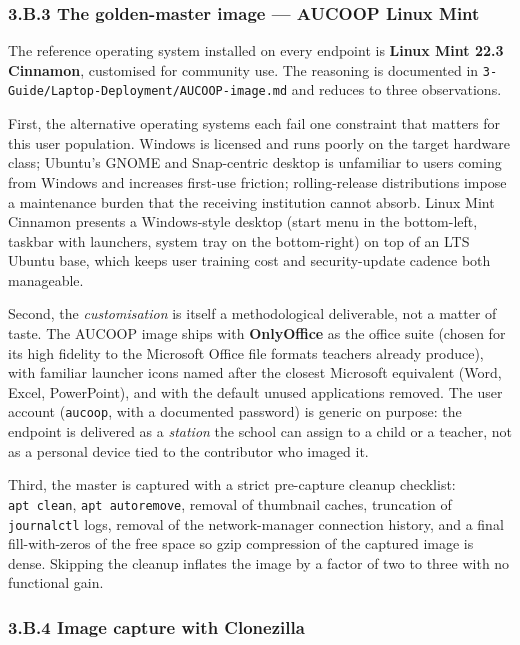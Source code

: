 \hypertarget{b.3-the-golden-master-image-aucoop-linux-mint}{%
\subsubsection{3.B.3 The golden-master image --- AUCOOP Linux
Mint}\label{b.3-the-golden-master-image-aucoop-linux-mint}}

The reference operating system installed on every endpoint is
\textbf{Linux Mint 22.3 Cinnamon}, customised for community use. The
reasoning is documented in
\texttt{3-Guide/Laptop-Deployment/AUCOOP-image.md} and reduces to three
observations.

First, the alternative operating systems each fail one constraint that
matters for this user population. Windows is licensed and runs poorly on
the target hardware class; Ubuntu's GNOME and Snap-centric desktop is
unfamiliar to users coming from Windows and increases first-use
friction; rolling-release distributions impose a maintenance burden that
the receiving institution cannot absorb. Linux Mint Cinnamon presents a
Windows-style desktop (start menu in the bottom-left, taskbar with
launchers, system tray on the bottom-right) on top of an LTS Ubuntu
base, which keeps user training cost and security-update cadence both
manageable.

Second, the \emph{customisation} is itself a methodological deliverable,
not a matter of taste. The AUCOOP image ships with \textbf{OnlyOffice}
as the office suite (chosen for its high fidelity to the Microsoft
Office file formats teachers already produce), with familiar launcher
icons named after the closest Microsoft equivalent (Word, Excel,
PowerPoint), and with the default unused applications removed. The user
account (\texttt{aucoop}, with a documented password) is generic on
purpose: the endpoint is delivered as a \emph{station} the school can
assign to a child or a teacher, not as a personal device tied to the
contributor who imaged it.

Third, the master is captured with a strict pre-capture cleanup
checklist: \texttt{apt\ clean}, \texttt{apt\ autoremove}, removal of
thumbnail caches, truncation of \texttt{journalctl} logs, removal of the
network-manager connection history, and a final fill-with-zeros of the
free space so gzip compression of the captured image is dense. Skipping
the cleanup inflates the image by a factor of two to three with no
functional gain.

\hypertarget{b.4-image-capture-with-clonezilla}{%
\subsubsection{3.B.4 Image capture with
Clonezilla}\label{b.4-image-capture-with-clonezilla}}

